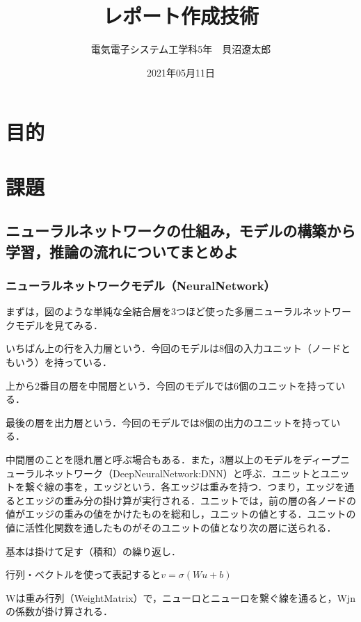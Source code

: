 \documentclass[uplatex,titlepage]{jsarticle}
\title{レポート作成技術}
\author{電気電子システム工学科5年　貝沼遼太郎}
\date{2021年05月11日}
\newif\iffigure
\begin{document}
\maketitle
\section{目的}

\section{課題}
\subsection{ニューラルネットワークの仕組み，モデルの構築から学習，推論の流れについてまとめよ}
\subsubsection{ニューラルネットワークモデル（NeuralNetwork）}
まずは，図のような単純な全結合層を3つほど使った多層ニューラルネットワークモデルを見てみる．\par
いちばん上の行を入力層という．今回のモデルは8個の入力ユニット（ノードともいう）を持っている．\par
上から2番目の層を中間層という．今回のモデルでは6個のユニットを持っている．\par
最後の層を出力層という．今回のモデルでは8個の出力のユニットを持っている．\par
中間層のことを隠れ層と呼ぶ場合もある．また，3層以上のモデルをディープニューラルネットワーク（DeepNeuralNetwork:DNN）と呼ぶ．ユニットとユニットを繋ぐ線の事を，エッジという．各エッジは重みを持つ．つまり，エッジを通るとエッジの重み分の掛け算が実行される．ユニットでは，前の層の各ノードの値がエッジの重みの値をかけたものを総和し，ユニットの値とする．ユニットの値に活性化関数を通したものがそのユニットの値となり次の層に送られる．
\iffigure
\begin{figure}[H]%
    \begin{center}
    \texttt{[image: deep\_learning\_model.png]} 
    \caption{多層ニューラルネットワークモデル}
    \end{center}
\end{figure}
\fi
基本は掛けて足す（積和）の繰り返し．\par
行列・ベクトルを使って表記すると$v=\sigma(Wu+b)$\par
Wは重み行列（WeightMatrix）で，ニューロとニューロを繋ぐ線を通ると，Wjnの係数が掛け算される．
\end{document}
